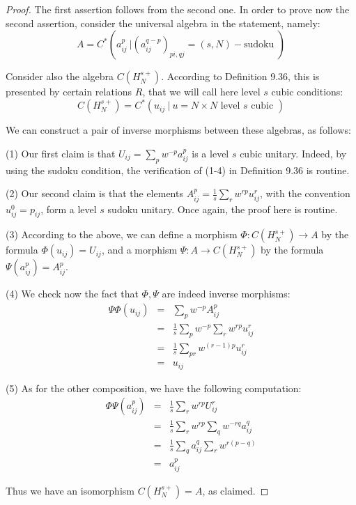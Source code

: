 \documentclass[12pt]{amsbook}
\begin{document}
\begin{proof}
The first assertion follows from the second one. In order to prove now the second assertion, consider the universal algebra in the statement, namely:
$$A=C^*\left(a_{ij}^p\ \Big\vert \left(a^{q-p}_{ij}\right)_{pi,qj}=(s,N)-\mbox{sudoku }\right)$$

Consider also the algebra $C(H_N^{s+})$. According to Definition 9.36, this is presented by certain relations $R$, that we will call here level $s$ cubic conditions:
$$C(H_N^{s+})=C^*\left(u_{ij}\ \Big\vert\  u=N\times N\mbox{ level $s$ cubic }\right)$$

We can construct a pair of inverse morphisms between these algebras, as follows:

\medskip

(1) Our first claim is that $U_{ij}=\sum_pw^{-p}a^p_{ij}$ is a level $s$ cubic unitary. Indeed, by using the sudoku condition, the verification of (1-4) in Definition 9.36 is routine.

\medskip

(2) Our second claim is that the elements $A^p_{ij}=\frac{1}{s}\sum_rw^{rp}u^r_{ij}$, with the convention $u_{ij}^0=p_{ij}$, form a level $s$ sudoku unitary. Once again, the proof here is routine.

\medskip

(3) According to the above, we can define a morphism $\Phi:C(H_N^{s+})\to A$ by the formula $\Phi(u_{ij})=U_{ij}$, and a morphism $\Psi:A\to C(H_N^{s+})$ by the formula $\Psi(a^p_{ij})=A^p_{ij}$.

\medskip

(4) We check now the fact that $\Phi,\Psi$ are indeed inverse morphisms:
\begin{eqnarray*}
\Psi\Phi(u_{ij})
&=&\sum_pw^{-p}A^p_{ij}\\
&=&\frac{1}{s}\sum_pw^{-p}\sum_rw^{rp}u_{ij}^r\\
&=&\frac{1}{s}\sum_{pr}w^{(r-1)p}u_{ij}^r\\
&=&u_{ij}
\end{eqnarray*}

(5) As for the other composition, we have the following computation:
\begin{eqnarray*}
\Phi\Psi(a^p_{ij})
&=&\frac{1}{s}\sum_rw^{rp}U_{ij}^r\\
&=&\frac{1}{s}\sum_rw^{rp}\sum_qw^{-rq}a_{ij}^q\\
&=&\frac{1}{s}\sum_qa_{ij}^q\sum_rw^{r(p-q)}\\
&=&a^p_{ij}
\end{eqnarray*}

Thus we have an isomorphism $C(H_N^{s+})=A$, as claimed.
\end{proof}
\end{document}
